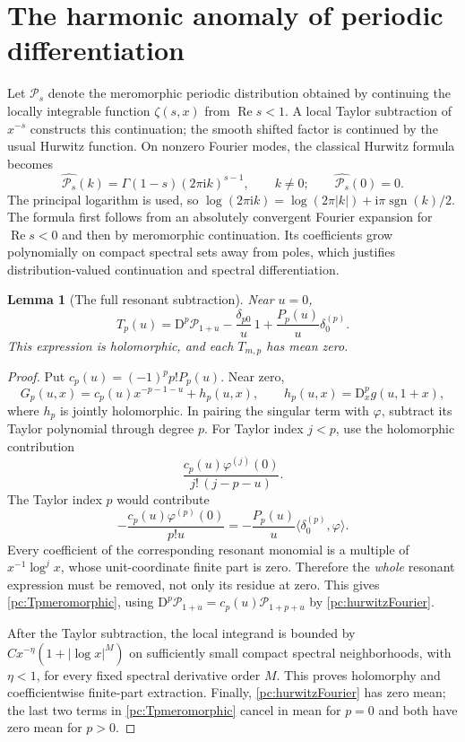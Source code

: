 \documentclass[11pt,a4paper]{article}
\numberwithin{equation}{section}
\newtheorem{lemma}[theorem]{Lemma}
\theoremstyle{definition}
\newcommand{\ii}{\mathrm i}
\newcommand{\D}{\mathrm D}
\newcommand{\Rea}{\operatorname{Re}}
\newcommand{\sgn}{\operatorname{sgn}}
\newcommand{\Pf}{\mathcal P}
\begin{document}
\section{The harmonic anomaly of periodic differentiation}\label{pc:derivsection}
Let $\Pf_s$ denote the meromorphic periodic distribution obtained by continuing the locally integrable function $\zeta(s,x)$ from $\Rea s<1$. A local Taylor subtraction of $x^{-s}$ constructs this continuation; the smooth shifted factor is continued by the usual Hurwitz function. On nonzero Fourier modes, the classical Hurwitz formula becomes
\begin{equation}\label{pc:hurwitzFourier}
 \widehat{\Pf_s}(k)=\Gamma(1-s)(2\pi\ii k)^{s-1},\qquad k\ne0;
 \qquad\widehat{\Pf_s}(0)=0.
\end{equation}
The principal logarithm is used, so $\log(2\pi\ii k)=\log(2\pi|k|)+\ii\pi\sgn(k)/2$. The formula first follows from an absolutely convergent Fourier expansion for $\Rea s<0$ and then by meromorphic continuation. Its coefficients grow polynomially on compact spectral sets away from poles, which justifies distribution-valued continuation and spectral differentiation.

\begin{lemma}[The full resonant subtraction]\label{pc:resonant}
Near $u=0$,
\begin{equation}\label{pc:Tpmeromorphic}
 T_p(u)=\D^p\Pf_{1+u}-\frac{\delta_{p0}}u\,1
                  +\frac{P_p(u)}u\delta_0^{(p)}.
\end{equation}
This expression is holomorphic, and each $T_{m,p}$ has mean zero.
\end{lemma}
\begin{proof}
Put $c_p(u)=(-1)^p p!P_p(u)$. Near zero,
\[
 G_p(u,x)=c_p(u)x^{-p-1-u}+h_p(u,x),\qquad
 h_p(u,x)=\D_x^pg(u,1+x),
\]
where $h_p$ is jointly holomorphic. In pairing the singular term with $\varphi$, subtract its Taylor polynomial through degree $p$. For Taylor index $j<p$, use the holomorphic contribution
\[
 \frac{c_p(u)\varphi^{(j)}(0)}{j!\,(j-p-u)}.
\]
The Taylor index $p$ would contribute
\[
 -\frac{c_p(u)\varphi^{(p)}(0)}{p!u}
 =-\frac{P_p(u)}u\langle\delta_0^{(p)},\varphi\rangle.
\]
Every coefficient of the corresponding resonant monomial is a multiple of $x^{-1}\log^j x$, whose unit-coordinate finite part is zero. Therefore the \emph{whole} resonant expression must be removed, not only its residue at zero. This gives \eqref{pc:Tpmeromorphic}, using $\D^p\Pf_{1+u}=c_p(u)\Pf_{1+p+u}$ by \eqref{pc:hurwitzFourier}.

After the Taylor subtraction, the local integrand is bounded by $C x^{-\eta}(1+|\log x|^M)$ on sufficiently small compact spectral neighborhoods, with $\eta<1$, for every fixed spectral derivative order $M$. This proves holomorphy and coefficientwise finite-part extraction. Finally, \eqref{pc:hurwitzFourier} has zero mean; the last two terms in \eqref{pc:Tpmeromorphic} cancel in mean for $p=0$ and both have zero mean for $p>0$.
\end{proof}
\end{document}
